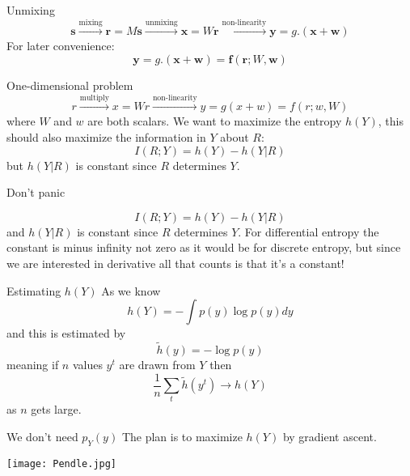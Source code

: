 \documentclass{beamer}
\newcommand{\crish}{\color{reddish}}
\newcommand{\cbla}{\color{black}}
\newcommand{\cred}{\color{red}}
\newcommand{\cblu}{\color{blue}}
\begin{document}
\begin{frame}{Unmixing}
\cred
$$
\mathbf{ s}\stackrel{\mbox{mixing}}{\longrightarrow}\mathbf{ r}=M\mathbf{ s}\stackrel{\mbox{unmixing}}{\longrightarrow}\mathbf{ x}=W\mathbf{ r}\stackrel{\mbox{non-linearity}}{\longrightarrow}\mathbf{y}=g.(\mathbf{x}+\mathbf{w})
$$
\cbla
For later convenience:
\crish
$$
\mathbf{y}=g.(\mathbf{x}+\mathbf{w})=\mathbf{f}(\mathbf{r};W,\mathbf{w})
$$
\cbla
\end{frame}

\begin{frame}{One-dimensional problem}
  \cred
$$
r\stackrel{\mbox{multiply}}{\longrightarrow}x=Wr\stackrel{\mbox{non-linearity}}{\longrightarrow}y=g(x+w)=f(r;w,W)
$$\cbla
where \crish$W$\cbla{} and \crish$w$\cbla{} are both scalars. We want to maximize the entropy \cblu$h(Y)$\cbla{}, this should also maximize the information in \crish$Y$\cbla{} about \crish$R$\cbla:
\crish $$
I(R;Y)=h(Y)-h(Y|R)
$$\cbla
but \crish$h(Y|R)$\cbla{} is constant since \crish$R$\cbla{} determines \crish$Y$\cbla.
\end{frame}


\begin{frame}{Don't panic}

\crish $$
I(R;Y)=h(Y)-h(Y|R)
$$\cbla and \crish$h(Y|R)$\cbla{} is constant since \crish$R$\cbla{}
determines \crish$Y$\cbla. For differential entropy the constant is
minus infinity not zero as it would be for discrete entropy, but since
we are interested in derivative all that counts is that it's a constant!
\end{frame}


\begin{frame}{Estimating $h(Y)$}
  As we know
  \crish$$
h(Y)=-\int p(y)\log{p(y)} dy
$$\cbla
and this is estimated by
\crish$$
\tilde{h}(y)=-\log{p(y)}
$$\cbla
meaning if \crish$n$\cbla{} values \crish$y^t$\cbla{} are drawn from \crish$Y$\cbla{} then
\crish
$$
\frac{1}{n}\sum_t\tilde{h}(y^t)\rightarrow h(Y)
$$
\cbla
as \crish$n$\cbla{} gets large. 
\end{frame}

\begin{frame}{We don't need $p_Y(y)$}
  The plan is to maximize \crish$h(Y)$\cbla{} by gradient ascent.
  \vskip 2cm
\begin{center}
  \texttt{[image: Pendle.jpg]}
\end{center}
\vfill
{}
\end{frame}
\end{document}
